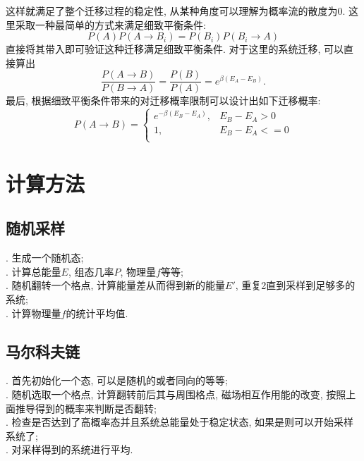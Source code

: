 \documentclass[UTF8]{ctexart}
\begin{document}
            这样就满足了整个迁移过程的稳定性, 从某种角度可以理解为概率流的散度为0. 这里采取一种最简单的方式来满足细致平衡条件:
            \begin{equation}
                P(A)P(A\rightarrow B_i)=P(B_i)P(B_i\rightarrow A)
            \end{equation}
            直接将其带入即可验证这种迁移满足细致平衡条件. 对于这里的系统迁移, 可以直接算出
            \begin{equation}
                \dfrac{P(A\rightarrow B)}{P(B\rightarrow A)}=\dfrac{P(B)}{P(A)}=e^{\beta(E_A-E_B)}.
            \end{equation}
            \indent 最后, 根据细致平衡条件带来的对迁移概率限制可以设计出如下迁移概率:
            \begin{equation}
                P(A\rightarrow B)=
                \left\{
                    \begin{array}{ll}
                        e^{-\beta(E_B-E_A)}, &E_B-E_A>0\\
                        1, &E_B-E_A<=0\\
                    \end{array}
                \right.
            \end{equation}
    \section{计算方法}
        \subsection{随机采样}
            . 生成一个随机态;\\
            . 计算总能量$E$, 组态几率$P$, 物理量$f$等等;\\
            . 随机翻转一个格点, 计算能量差从而得到新的能量$E'$, 重复2直到采样到足够多的系统;\\
            . 计算物理量$f$的统计平均值.
        \subsection{马尔科夫链}
            . 首先初始化一个态, 可以是随机的或者同向的等等;\\
            . 随机选取一个格点, 计算翻转前后其与周围格点, 磁场相互作用能的改变, 按照上面推导得到的概率来判断是否翻转;\\
            . 检查是否达到了高概率态并且系统总能量处于稳定状态, 如果是则可以开始采样系统了;\\
            . 对采样得到的系统进行平均.
\end{document}
